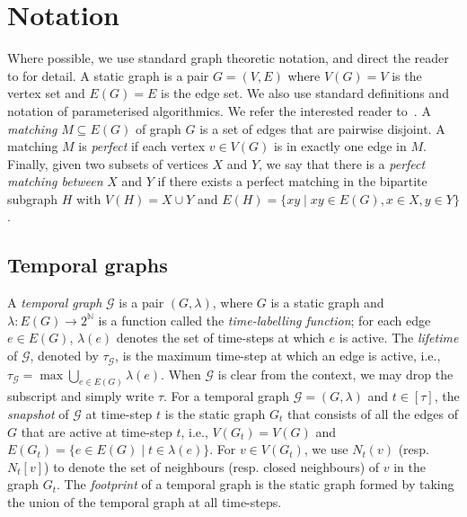 \section{Notation}
\label{sec:notation}
Where possible, we use standard graph theoretic notation, and direct the reader to \cite{golumbic} for detail.  A static graph is a pair $G = (V, E)$ where $V(G) = V$ is the vertex set and $E(G) = E$ is the edge set. We also use standard definitions and notation of parameterised algorithmics. We refer the interested reader to~\cite{cygan_parameterized_2015}.
%
A \emph{matching} $M \subseteq E(G)$ of graph $G$ is a set of edges that are pairwise disjoint. A matching $M$ is \emph{perfect} if each vertex $v \in V(G)$ is in exactly one edge in $M$.  Finally, given two subsets of vertices $X$ and $Y$, we say that there is a \emph{perfect matching between} $X$ and $Y$ if there exists a perfect matching in the bipartite subgraph $H$ with $V(H) = X \cup Y$ and $E(H) = \{xy \mid xy \in E(G), x \in X, y\in Y \}$. 

%

\subsection{Temporal graphs}
A \emph{temporal graph} $\mathcal{G}$ is a pair $(G, \lambda)$, where $G$ is a static graph and $\lambda : E(G) \to 2^{\mathbb{N}}$ is a function called the \emph{time-labelling function}; for each edge $e \in E(G)$, $\lambda(e)$ denotes the set of time-steps at which $e$ is active. 
The \emph{lifetime} of $\mathcal{G}$, denoted by $\tau_{\mathcal{G}}$, is the maximum time-step at which an edge is active, i.e., $\tau_{\mathcal{G}} = \max \bigcup_{e \in E(G)} \lambda(e)$. 
When $\mathcal{G}$ is clear from the context, we may drop the subscript and simply write $\tau$. 
For a temporal graph $\mathcal{G} = (G, \lambda)$ and $t \in [\tau]$, the \emph{snapshot} of $\mathcal{G}$ at time-step $t$ is the static graph $G_t$ that consists of all the edges of $G$ that are active at time-step $t$, i.e.,  $V(G_t) = V(G)$ and $E(G_t) = \{e \in E(G) \mid t \in \lambda(e)\}$. For $v \in V(G_t)$, we use $N_t(v)$ (resp. $N_t[v]$) to denote the set of neighbours (resp. closed neighbours) of $v$ in the graph $G_t$. The \emph{footprint} of a temporal graph is the static graph formed by taking the union of the temporal graph at all time-steps. 


